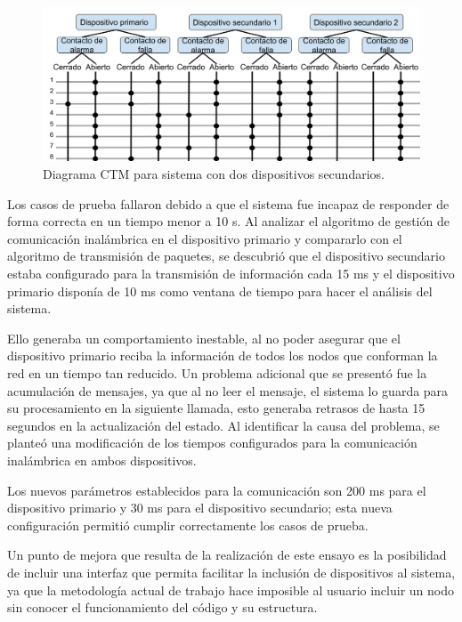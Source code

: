 \begin{figure}[ht]
	\centering
	\includegraphics[scale=.35]{./Figures/Capitulo4/Figura_L.png}
	\caption{Diagrama CTM para sistema con dos dispositivos secundarios.}
	\label{fig:figura_l}
\end{figure}

Los casos de prueba fallaron debido a que el sistema fue incapaz de responder de forma correcta en un tiempo menor a 10 s. Al analizar el algoritmo de gestión de comunicación inalámbrica en el dispositivo primario y compararlo con el algoritmo de transmisión de paquetes, se descubrió que el dispositivo secundario estaba configurado para la transmisión de información cada 15 ms y el dispositivo primario disponía de 10 ms como ventana de tiempo para hacer el análisis del sistema. 

Ello generaba un comportamiento inestable, al no poder asegurar que el dispositivo primario reciba la información de todos los nodos que conforman la red en un tiempo tan reducido. Un problema adicional que se presentó fue la acumulación de mensajes, ya que al no leer el mensaje, el sistema lo guarda para su procesamiento en la siguiente llamada, esto generaba retrasos de hasta 15 segundos en la actualización del estado. Al identificar la causa del problema, se planteó una modificación de los tiempos configurados para la comunicación inalámbrica en ambos dispositivos. 

Los nuevos parámetros establecidos para la comunicación son 200 ms para el dispositivo primario y 30 ms para el dispositivo secundario; esta nueva configuración permitió cumplir correctamente los casos de prueba.

      
Un punto de mejora que resulta de la realización de este ensayo es la posibilidad de incluir una interfaz que permita facilitar la inclusión de dispositivos al sistema, ya que la metodología actual de trabajo hace imposible al usuario incluir un nodo sin conocer el funcionamiento del código y su estructura.

